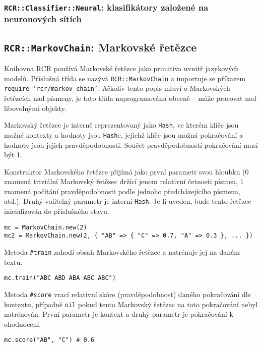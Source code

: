 \documentclass[a4paper]{article}
\begin{document}
\subsubsection{\texttt{RCR::Classifier::Neural}: klasifikátory založené na
neuronových sítích}

\subsection{\texttt{RCR::MarkovChain}: Markovské řetězce}
Knihovna RCR používá Markovské řetězce jako primitiva uvnitř jazykových modelů.
Příslušná třída se nazývá \texttt{RCR::MarkovChain} a importuje se příkazem
\texttt{require 'rcr/markov\_chain'}. Ačkoliv tento popis mluví o Markovských
řetězcích nad písmeny, je tato třída naprogramována obecně -- může pracovat nad
libovolnými objekty.

Markovský řetězec je interně reprezentovaný jako \texttt{Hash}, ve kterém klíče
jsou možné kontexty a hodnoty jsou \texttt{Hash}e, jejichž klíče jsou možná
pokračování a hodnoty jsou jejich pravděpodobnosti. Součet pravděpodobností
pokračování musí být 1.

Konstruktor Markovského řetězce přijímá jako první parametr svou hloubku (0
znamená triviální Markovský řetězec držící jenom relativní četnosti písmen, 1
znamená počítání pravděpodobnosti podle jednoho předcházejícího písmena, atd.).
Druhý volitelný parametr je interní \texttt{Hash}. Je-li uveden, bude tento
řetězec inicializován do příslušného stavu.
\begin{lstlisting}
mc = MarkovChain.new(2)
mc2 = MarkovChain.new(2, { "AB" => { "C" => 0.7, "A" => 0.3 }, ... })
\end{lstlisting}

Metoda \texttt{\#train} zahodí obsah Markovského řetězce a natrénuje jej na
daném textu.
\begin{lstlisting}
mc.train("ABC ABD ABA ABC ABC")
\end{lstlisting}

Metoda \texttt{\#score} vrací relativní skóre (pravděpodobnost) daného
pokračování dle kontextu, případně \texttt{nil} pokud tento Markovský řetězec
na toto pokračování nebyl natrénován. První parametr je kontext a druhý parametr
je pokračování k ohodnocení.
\begin{lstlisting}
mc.score("AB", "C") # 0.6
\end{lstlisting}

\end{document}
